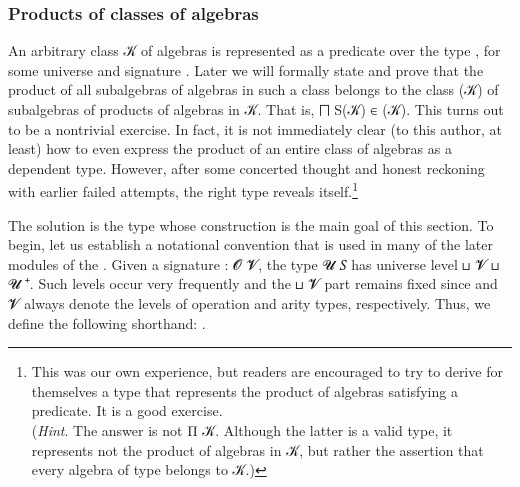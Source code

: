 \subsubsection{Products of classes of algebras}\label{products-of-classes-of-algebras}

An arbitrary class \ab 𝒦 of algebras is represented as a predicate over the type \AgdaSpace{}\AgdaSpace{}, for some universe  and signature .
Later we will formally state and prove that the product of all subalgebras of algebras in such a class belongs to the class (\ab 𝒦) of subalgebras of products of algebras in \ab 𝒦. That is, \af ⨅ \af S(\ab 𝒦) \af ∈ (\ab 𝒦). This turns out to be a nontrivial exercise. In fact, it is not immediately clear (to this author, at least) how to even express the product of an entire class of algebras as a dependent type. However, after some concerted thought and honest reckoning with earlier failed attempts, the right type reveals itself.\footnote{%
This was our own experience, but readers are encouraged to try to derive for themselves a type that represents the product of algebras satisfying a predicate. It is a good exercise.\\
(\textit{Hint}. The answer is not \ad Π \ab 𝒦. Although the latter is a valid type, it represents not the product of algebras in \ab 𝒦, but rather the assertion that every algebra of type \AgdaSpace{}\AgdaSpace{} belongs to \ab 𝒦.)}

The solution is the  type whose construction is the main goal of this section. To begin, let us establish a notational convention that is used in many of the later modules of the \ualib. Given a signature  \as :  \ab  𝓞 \ab 𝓥, the type  \ab 𝓤 \ab 𝑆 has universe level  \ap ⊔ \ab 𝓥 \ap ⊔ \ab 𝓤 \af ⁺. Such levels occur very frequently and the  \ap ⊔ \ab 𝓥 part remains fixed since  and \ab 𝓥 always denote the levels of operation and arity types, respectively. Thus, we define the following shorthand: \AgdaSpace{}%
\AgdaSpace{}%
\AgdaSymbol{:=}\AgdaSpace{}%
\AgdaSpace{}%
\AgdaSpace{}%
\AgdaSpace{}%
\AgdaSpace{}%
\AgdaSpace{}%
.

